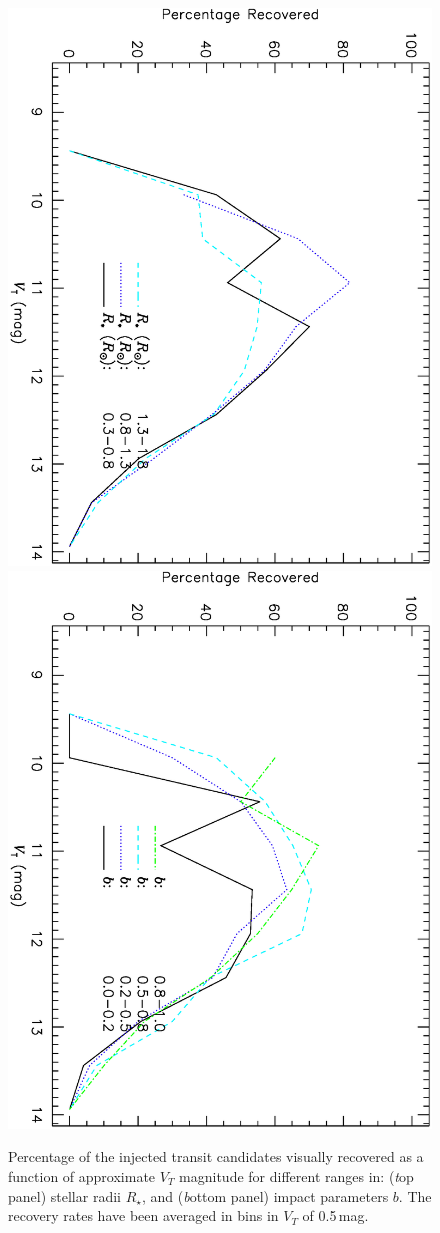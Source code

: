 \begin{figure}
\begin{center}
\centering
\includegraphics[width=.55\textwidth, angle=90]{7_visual_h}\\
\includegraphics[width=.55\textwidth, angle=90]{7_visual_i}\\
\caption[Visual recovery of different stellar radii and impact parameters]{%
Percentage of the injected transit candidates visually recovered as a function of approximate $V_{T}$ magnitude for different ranges in: %
({\textit top panel}) stellar radii $R_{\star}$, and %
({\textit bottom panel}) impact parameters $b$. %
The recovery rates have been averaged in bins in $V_{T}$ of 0.5\,mag.%
}\label{cha:human:sec:model:fig:visrecrates2}
\end{center}
\end{figure}

